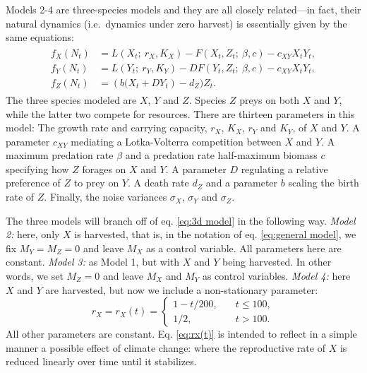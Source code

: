 \documentclass{article}
\begin{document}
Models 2-4 are three-species models and they are all closely
related---in fact, their natural dynamics (i.e.~dynamics under zero
harvest) is essentially given by the same equations: \begin{align}
\label{eq:3d model}
\begin{split}
  f_X(N_t) &= L(X_t;\ r_X, K_X) - F(X_t, Z_t;\ \beta, c) - c_{XY}X_tY_t, \\
  f_Y(N_t) &= L(Y_t;\ r_Y, K_Y) - D F(Y_t, Z_t;\ \beta, c) - c_{XY}X_tY_t,\\
  f_Z(N_t) &= \left(b(X_t + DY_t\right) - d_Z)Z_t.
\end{split}
\end{align} The three species modeled are \(X\), \(Y\) and \(Z\).
Species \(Z\) preys on both \(X\) and \(Y\), while the latter two
compete for resources. There are thirteen parameters in this model: The
growth rate and carrying capacity, \(r_X\), \(K_X\), \(r_Y\) and
\(K_Y\), of \(X\) and \(Y\). A parameter \(c_{XY}\) mediating a
Lotka-Volterra competition between \(X\) and \(Y\). A maximum predation
rate \(\beta\) and a predation rate half-maximum biomass \(c\)
specifying how \(Z\) forages on \(X\) and \(Y\). A parameter \(D\)
regulating a relative preference of \(Z\) to prey on \(Y\). A death rate
\(d_Z\) and a parameter \(b\) scaling the birth rate of \(Z\). Finally,
the noise variances \(\sigma_X\), \(\sigma_Y\) and \(\sigma_Z\).

The three models will branch off of eq. \eqref{eq:3d model} in the
following way. \emph{Model 2:} here, only \(X\) is harvested, that is,
in the notation of eq. \eqref{eq:general model}, we fix \(M_Y=M_Z=0\)
and leave \(M_X\) as a control variable. All parameters here are
constant. \emph{Model 3:} as Model 1, but with \(X\) and \(Y\) being
harvested. In other words, we set \(M_Z=0\) and leave \(M_X\) and
\(M_Y\) as control variables. \emph{Model 4:} here \(X\) and \(Y\) are
harvested, but now we include a non-stationary parameter:
\begin{equation}
  \label{eq:rx(t)}
  r_X = r_X(t) = 
  \begin{cases}
    1-t/200, \quad & t \leq 100,\\
    1/2, \quad & t > 100.
  \end{cases}
\end{equation} All other parameters are constant. Eq. \eqref{eq:rx(t)}
is intended to reflect in a simple manner a possible effect of climate
change: where the reproductive rate of \(X\) is reduced linearly over
time until it stabilizes.
\end{document}
